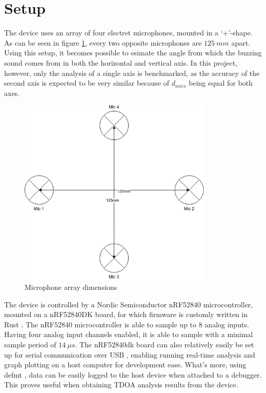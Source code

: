 \documentclass[a4paper]{article}
\begin{document}
\section{Setup}

The device uses an array of four electret microphones, mounted in a `+'-shape. As can be seen in figure \ref{fig:mic_array_dimensions}, every two opposite microphones are $125\ mm$ apart. Using this setup, it becomes possible to esimate the angle from which the buzzing sound comes from in both the horizontal and vertical axis. In this project, however, only the analysis of a single axis is benchmarked, as the accuracy of the second axis is expected to be very similar because of $d_{mics}$ being equal for both axes.

\begin{figure}
    \begin{center}
        \includegraphics[width=25em]{assets/mic_array_dimensions.png}
        \caption{Microphone array dimensions}
        \label{fig:mic_array_dimensions}
    \end{center}
\end{figure}

The device is controlled by a Nordic Semiconductor nRF52840 microcontroller, mounted on a nRF52840DK board, for which firmware is customly written in Rust \cite{rust}.  The nRF52840 microcontroller is able to sample up to 8 analog inputs. Having four analog input channels enabled, it is able to sample with a minimal sample period of $14\ \mu s$. The nRF52840dk board can also relatively easily be set up for serial communication over USB \cite{usb}, enabling running real-time analysis and graph plotting on a host computer for development ease. What's more, using defmt \cite{defmt}, data can be easily logged to the host device when attached to a debugger. This proves useful when obtaining TDOA analysis results from the device. 
\end{document}
